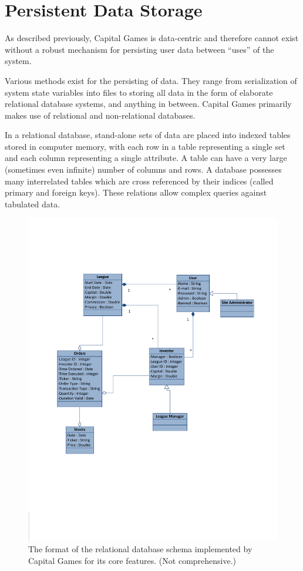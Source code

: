 \section{Persistent Data Storage}

As described previously, Capital Games is data-centric
and therefore cannot exist without a robust mechanism
for persisting user data between ``uses'' of the system.

Various methods exist for the persisting of data. They range
from serialization of system state variables into files
to storing all data in the form of elaborate relational
database systems, and anything in between. Capital Games
primarily makes use of relational and non-relational databases.

In a relational database, stand-alone sets of data are placed
into indexed tables stored in computer memory, with each row in a table
representing a single set and each column representing a single
attribute. A table can have a very large (sometimes even 
infinite) number of columns and rows. A database possesses
many interrelated tables which are cross referenced by their
indices (called primary and foreign keys). These relations
allow complex queries against tabulated data. \cite{wiki:rdb}

\begin{figure}[ht]
\centering
\includegraphics[width=6in]{./img/domainModel.pdf}
\caption{The format of the relational database
schema implemented by Capital Games for its core features.
(Not comprehensive.)}
\end{figure}

